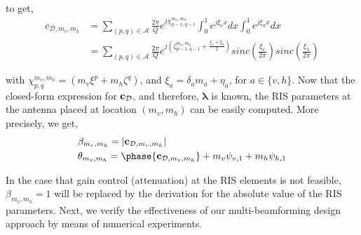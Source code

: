 to get, 
\begin{align}
    c_{\mathcal{D}, m_v, m_h} &=  \sum_{(p,q) \in \mathcal{A}}\frac{2\pi}{Q}e^{j\chi_{p-1, q-1}^{m_v, m_h}}
    \int_{0}^{1} e^{j\xi_v x}dx\int_{0}^{1} e^{j\xi_h x}dx \nonumber\\&
    = \sum_{(p,q) \in \mathcal{A}}\frac{2\pi}{Q}e^{j(\zeta_{p-1, q-1}^{m_v, m_h}+ \frac{\xi_v+\xi_h}{2})} sinc(\frac{\xi_v}{2\pi})sinc(\frac{\xi_h}{2\pi})
\end{align}

\noindent with $ \chi_{p,q}^{m_v, m_h} = \left( m_v\xi^{p} + m_h\zeta^{q}\right)$, and $\xi_a = {\delta_a}{m_a} + \eta_a$,  for $a\in \{v,h\}$. Now that the closed-form expression for ${\bf{c}}_{\mathcal{D}}$, and therefore, $\boldsymbol{\lambda}$  is known, the RIS parameters at the antenna placed at location $(m_v, m_h)$ can be easily computed. More precisely, we get, 
\begin{align}
    &\beta_{m_v, m_h} = {|\c_{\mathcal{D}, m_v, m_h}|}\\
    & \theta_{m_v, m_h} = \phase{\c_{\mathcal{D}, m_v, m_h}} + m_v\psi_{v,1} + m_h\psi_{h,1}
\end{align}

In the case that gain control (attenuation) at the RIS elements is not feasible, $\beta_{m_v, m_h} = 1$ will be replaced by the derivation for the absolute value of the RIS parameters. Next, we verify the effectiveness of our multi-beamforming design approach by means of numerical experiments. 



